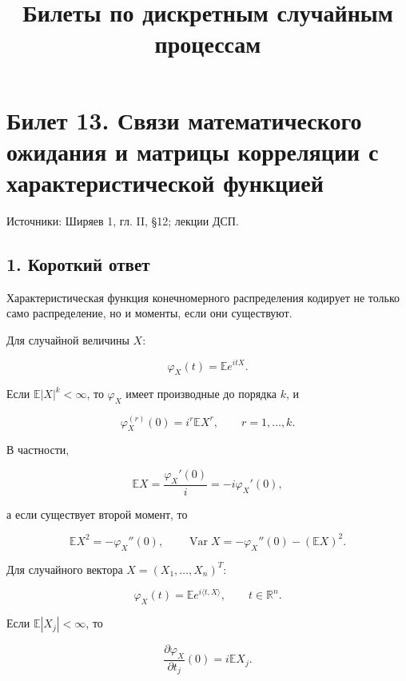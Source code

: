 \documentclass[
  11pt,
  a4paper,
]{article}
\title{Билеты по дискретным случайным процессам}
\author{}
\date{}
\begin{document}
\maketitle

\section{Билет 13. Связи математического ожидания и матрицы корреляции с
характеристической
функцией}\label{ux431ux438ux43bux435ux442-13.-ux441ux432ux44fux437ux438-ux43cux430ux442ux435ux43cux430ux442ux438ux447ux435ux441ux43aux43eux433ux43e-ux43eux436ux438ux434ux430ux43dux438ux44f-ux438-ux43cux430ux442ux440ux438ux446ux44b-ux43aux43eux440ux440ux435ux43bux44fux446ux438ux438-ux441-ux445ux430ux440ux430ux43aux442ux435ux440ux438ux441ux442ux438ux447ux435ux441ux43aux43eux439-ux444ux443ux43dux43aux446ux438ux435ux439}

Источники: Ширяев 1, гл. II, §12; лекции ДСП.

\subsection{1. Короткий
ответ}\label{ux43aux43eux440ux43eux442ux43aux438ux439-ux43eux442ux432ux435ux442}

Характеристическая функция конечномерного распределения кодирует не
только само распределение, но и моменты, если они существуют.

Для случайной величины \(X\):

\[
\varphi_X(t)=\mathbb E e^{itX}.
\]

Если \(\mathbb E|X|^k<\infty\), то \(\varphi_X\) имеет производные до
порядка \(k\), и

\[
\varphi_X^{(r)}(0)=i^r\mathbb E X^r,
\qquad r=1,\ldots,k.
\]

В частности,

\[
\mathbb EX=\frac{\varphi_X'(0)}{i}=-i\varphi_X'(0),
\]

а если существует второй момент, то

\[
\mathbb EX^2=-\varphi_X''(0),
\qquad
\operatorname{Var}X=-\varphi_X''(0)-(\mathbb EX)^2.
\]

Для случайного вектора \(X=(X_1,\ldots,X_n)^T\):

\[
\varphi_X(t)=\mathbb E e^{i\langle t,X\rangle},
\qquad t\in\mathbb R^n.
\]

Если \(\mathbb E|X_j|<\infty\), то

\[
\frac{\partial\varphi_X}{\partial t_j}(0)=i\mathbb EX_j.
\]
\end{document}
